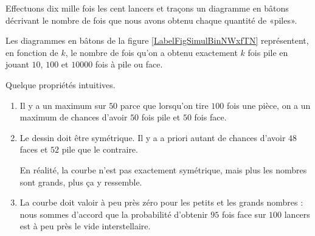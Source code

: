 \begin{example}

Effectuons dix mille fois les cent lancers et traçons un diagramme en bâtons décrivant le nombre de fois que nous avons obtenu chaque quantité de «piles».

Les diagrammes en bâtons de la figure \ref{LabelFigSimulBinNWxfTN} %
représentent, en fonction de \( k\), le nombre de fois qu'on a obtenu exactement \( k\) fois pile en jouant \( 10\), \( 100\) et \( 10000\) fois à pile ou face.
\newcommand{\CaptionFigSimulBinNWxfTN}{Jouer à pile ou face un certain nombre de fois, et s'intéresser au nombre de fois que le «pile» sort.}



Quelque propriétés intuitives.
\begin{enumerate}
    \item
        Il y a un maximum sur \( 50\) parce que lorsqu'on tire \( 100\) fois une pièce, on a un maximum de chances d'avoir \( 50\) fois pile et \( 50\) fois face.
    \item
        Le dessin doit être symétrique. Il y a a priori autant de chances d'avoir \( 48\) faces et \( 52\) pile que le contraire.

        En réalité, la courbe n'est pas exactement symétrique, mais plus les nombres sont grands, plus ça y ressemble.
    \item
        La courbe doit valoir à peu près zéro pour les petits et les grands nombres : nous sommes d'accord que la probabilité d'obtenir \( 95\) fois face sur \( 100\) lancers est à peu près le vide interstellaire.
\end{enumerate}
    
\end{example}

